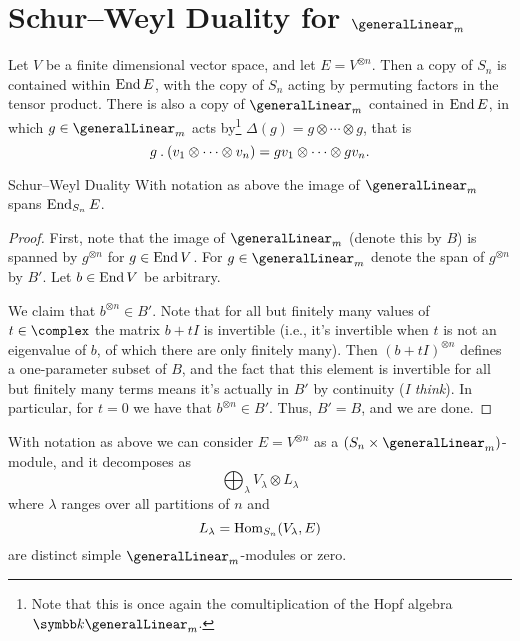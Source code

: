 \section{Schur--Weyl Duality for \texorpdfstring{\(\generalLinear_m\)}{GLm}}

Let \(V\) be a finite dimensional vector space, and let \(E = V^{\otimes n}\).
Then a copy of \(S_n\) is contained within \(\operatorname{End} E\), with the copy of \(S_n\) acting by permuting factors in the tensor product.
There is also a copy of \(\generalLinear_m\) contained in \(\operatorname{End} E\), in which \(g \in \generalLinear_m\) acts by\footnote{Note that this is once again the comultiplication of the Hopf algebra \(\field \generalLinear_m\).} \(\Delta(g) = g \otimes \dotsb \otimes g\), that is
\begin{equation}
    g \mathbin{.} (v_1 \otimes \dotsb \otimes v_n) = gv_1 \otimes \dotsb \otimes gv_n.
\end{equation}

\begin{thm}{Schur--Weyl Duality}{}
    With notation as above the image of \(\generalLinear_m\) spans \(\operatorname{End}_{S_n} E\).
    \begin{proof}
        First, note that the image of \(\generalLinear_m\) (denote this by \(B\)) is spanned by \(g^{\otimes n}\) for \(g \in \operatorname{End} V\).
        For \(g \in \generalLinear_m\) denote the span of \(g^{\otimes n}\) by \(B'\).
        Let \(b \in \operatorname{End} V\) be arbitrary.
        
        We claim that \(b^{\otimes n} \in B'\).
        Note that for all but finitely many values of \(t \in \complex\) the matrix \(b + tI\) is invertible (i.e., it's invertible when \(t\) is not an eigenvalue of \(b\), of which there are only finitely many).
        Then \((b + tI)^{\otimes n}\) defines a one-parameter subset of \(B\), and the fact that this element is invertible for all but finitely many terms means it's actually in \(B'\) by continuity (\emph{I think}).
        In particular, for \(t = 0\) we have that \(b^{\otimes n} \in B'\).
        Thus, \(B' = B\), and we are done.
    \end{proof}
\end{thm}

\begin{crl}{}{}
    With notation as above we can consider \(E = V^{\otimes n}\) as a \((S_n \times \generalLinear_m)\)-module, and it decomposes as
    \begin{equation}
        \bigoplus_\lambda V_\lambda \otimes L_\lambda
    \end{equation}
    where \(\lambda\) ranges over all partitions of \(n\) and
    \begin{equation}
        L_\lambda = \operatorname{Hom}_{S_n}(V_\lambda, E)
    \end{equation}
    are distinct simple \(\generalLinear_m\)-modules or zero.
\end{crl}

